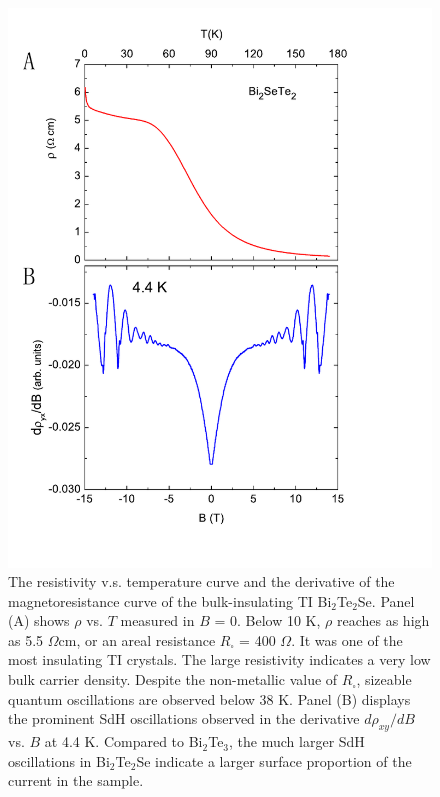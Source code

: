 \begin{figure}[!htbp]
  \begin{center}            
\includegraphics[width=0.9\linewidth]{ch-bts/figures/FigRvsT_lo.pdf} 
\caption{\label{figRvsT_lo}
The resistivity v.s. temperature curve and the derivative of the magnetoresistance curve of the bulk-insulating TI Bi$_2$Te$_2$Se.
Panel (A) shows $\rho$ vs. $T$ measured in $B$ = 0.  Below 10 K, $\rho$ 
reaches as high as 5.5 $\Omega$cm, or an areal
resistance $R_{\square}$ = 400 $\Omega$.  It was one of the most insulating TI crystals. The large resistivity indicates a very low bulk carrier density. Despite the non-metallic
value of $R_{\square}$, sizeable quantum oscillations are observed below 38 K.
Panel (B) displays the prominent SdH oscillations observed 
in the derivative $d\rho_{xy}/dB$ vs. $B$ at 4.4 K. Compared to Bi$_2$Te$_3$, the much larger SdH oscillations in Bi$_2$Te$_2$Se indicate a larger surface proportion of the current in the sample.
} 
  \end{center}
\end{figure}

